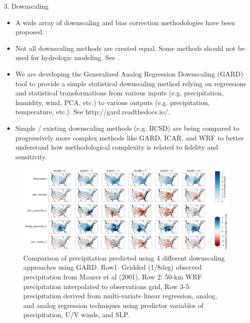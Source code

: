 \documentclass{beamer}
\begin{document}
\begin{frame}{}
\begin{columns}
\begin{column}{.3333\paperwidth}
\begin{textblock}{\textwidth \TPHorizModule}
\begin{block}{3. Downscaling}

     \begin{itemize}
      \justifying

      \item A wide array of downscaling and bias correction methodologies have been proposed.
      \item Not all downscaling methods are created equal. Some methods should not be used for hydrologic modeling. See \citet{Gutmann_2014}.
      \item We are developing the Generalized Analog Regression Downscaling (GARD) tool to provide a simple statistical downscaling method relying on regressions and statistical transformations from various inputs (e.g. precipitation, humidity, wind, PCA, etc.) to various outputs (e.g. precipitation, temperature, etc.). See http://gard.readthedocs.io/.
      \item Simple / existing downscaling methods (e.g. BCSD) are being compared to progressively more complex methods like GARD, ICAR, and WRF to better understand how methodological complexity is related to fidelity and sensitivity.

     \end{itemize}

     \begin{figure}
      \center\includegraphics[width=\linewidth]{figures/downscaling.png}
      \caption{Comparison of precipitation predicted using 4 different downscaling approaches using GARD. Row1: Gridded (1/8deg) observed precipitation from Maurer et al (2001), Row 2: 50-km WRF precipitation interpolated to observations grid, Row 3-5: precipitation derived from multi-variate linear regression, analog, and analog regression techniques using predictor variables of precipitation, U/V winds, and SLP.}
      \label{fig:downscaling}
     \end{figure}


\end{block}
\end{textblock}
\end{column}
\end{columns}
\end{frame}
\end{document}
